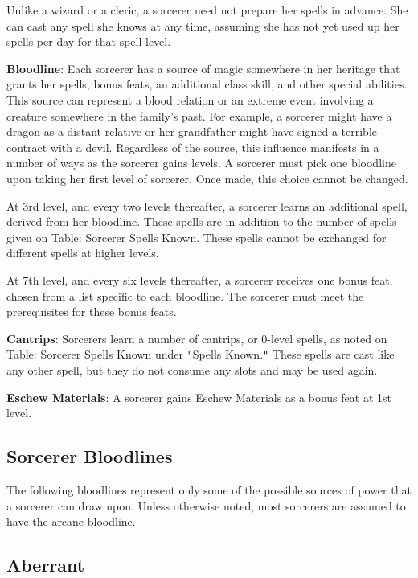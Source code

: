 Unlike a wizard or a cleric, a sorcerer need not prepare her spells in advance. She can cast any spell she knows at any time, assuming she has not yet used up her spells per day for that spell level.
				
\textbf{Bloodline}: Each sorcerer has a source of magic somewhere in her heritage that grants her spells, bonus feats, an additional class skill, and other special abilities. This source can represent a blood relation or an extreme event involving a creature somewhere in the family's past. For example, a sorcerer might have a dragon as a distant relative or her grandfather might have signed a terrible contract with a devil. Regardless of the source, this influence manifests in a number of ways as the sorcerer gains levels. A sorcerer must pick one bloodline upon taking her first level of sorcerer. Once made, this choice cannot be changed.
				
At 3rd level, and every two levels thereafter, a sorcerer learns an additional spell, derived from her bloodline. These spells are in addition to the number of spells given on Table: Sorcerer Spells Known. These spells cannot be exchanged for different spells at higher levels.
				
At 7th level, and every six levels thereafter, a sorcerer receives one bonus feat, chosen from a list specific to each bloodline. The sorcerer must meet the prerequisites for these bonus feats. 
				
\textbf{Cantrips}: Sorcerers learn a number of cantrips, or 0-level spells, as noted on Table: Sorcerer Spells Known under \texttt{{}"{}}Spells Known.\texttt{{}"{}} These spells are cast like any other spell, but they do not consume any slots and may be used again.
				
\textbf{Eschew Materials}: A sorcerer gains Eschew Materials as a bonus feat at 1st level.
				
\subsection{Sorcerer Bloodlines}

				
The following bloodlines represent only some of the possible sources of power that a sorcerer can draw upon. Unless otherwise noted, most sorcerers are assumed to have the arcane bloodline.
				
\subsection{Aberrant}

